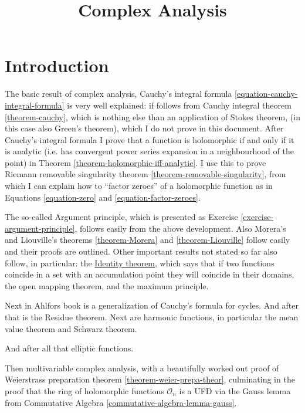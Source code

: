 



\title{Complex Analysis}
\maketitle

\label{section-phantom}

\tableofcontents

\section{Introduction}
\label{section-Introduction}

The basic result of complex analysis,
Cauchy's integral formula
\ref{equation-cauchy-integral-formula}
is very well explained:
if follows from Cauchy integral theorem
\ref{theorem-cauchy},
which is nothing else than an application of
Stokes theorem,
(in this case also Green's theorem),
which I do not prove in this document.
After Cauchy's integral formula
I prove that a function is holomorphic
if and only if it is analytic (i.e. has
convergent
power series expansion in a neighbourhood of
the point)
in Theorem
\ref{theorem-holomorphic-iff-analytic}.
I use this to prove Riemann removable
singularity theorem
\ref{theorem-removable-singularity},
from which I can explain how to ``factor
zeroes'' of a
holomorphic function as in Equations
\ref{equation-zero}
and \ref{equation-factor-zeroes}.

The so-called Argument principle,
which is presented as Exercise
\ref{exercise-argument-principle},
follows easily from the above development.
Also Morera's and Liouville's
theorems \ref{theorem-Morera} and
\ref{theorem-Liouville} follow easily
and their proofs are outlined.
Other important results not stated so far
also follow,
in particular: the
\href{https://en.wikipedia.org/wiki/%
Identity_theorem}{
Identity theorem},
which says that if two functions coincide in
a
set with an accumulation point they will
coincide in their domains,
the open mapping theorem, and the maximum
principle.

Next in Ahlfors book is a generalization of
Cauchy's formula
for cycles. And after that is the Residue
theorem.
Next are harmonic functions, in particular
the mean value theorem and Schwarz theorem.

And after all that elliptic functions.

\medskip\noindent
Then multivariable complex analysis,
with a beautifully worked out proof of
Weierstrass preparation theorem
\ref{theorem-weier-prepa-theor},
culminating in the proof that the ring of
holomorphic
functions $\mathcal{O}_n$ is a UFD via the
Gauss lemma
from Commutative Algebra
\ref{commutative-algebra-lemma-gauss}.

